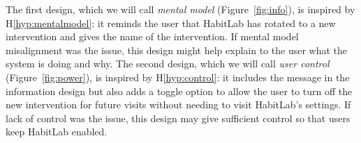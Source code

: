 The first design, which we will call \textit{mental model} (Figure~\ref{fig:info}), is inspired by H\ref*{hyp:mentalmodel}: it reminds the user that HabitLab has rotated to a new intervention and gives the name of the intervention. If mental model misalignment was the issue, this design might help explain to the user what the system is doing and why. The second design, which we will call \textit{user control} (Figure~\ref{fig:power}), is inspired by H\ref*{hyp:control}: it includes the message in the information design but also adds a toggle option to allow the user to turn off the new intervention for future visits without needing to visit HabitLab's settings. If lack of control was the issue, this design may give sufficient control so that users keep HabitLab enabled. 

